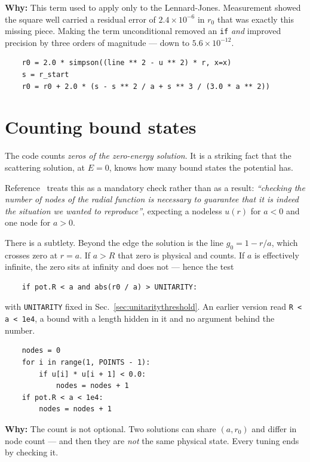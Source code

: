 \documentclass[11pt,a4paper]{article}
\newcommand{\why}[1]{\medskip\noindent\textbf{Why:} #1\medskip}
\begin{document}
\why{This term used to apply only to the Lennard-Jones. Measurement showed the
square well carried a residual error of $2.4\times10^{-6}$ in $r_0$ that was
exactly this missing piece. Making the term unconditional removed an
\texttt{if} \emph{and} improved precision by three orders of magnitude --- down
to $5.6\times10^{-12}$.}

\begin{lstlisting}
    r0 = 2.0 * simpson((line ** 2 - u ** 2) * r, x=x)
    s = r_start
    r0 = r0 + 2.0 * (s - s ** 2 / a + s ** 3 / (3.0 * a ** 2))
\end{lstlisting}

\section{Counting bound states}
\label{sec:nodes}

The code counts \emph{zeros of the zero-energy solution}. It is a striking fact
that the scattering solution, at $E=0$, knows how many bound states the
potential has.

Reference~\cite{rbef} treats this as a mandatory check rather than as a result:
\emph{``checking the number of nodes of the radial function is necessary to
guarantee that it is indeed the situation we wanted to reproduce''}, expecting a
nodeless $u(r)$ for $a<0$ and one node for $a>0$.

There is a subtlety. Beyond the edge the solution is the line $g_0 = 1 - r/a$,
which crosses zero at $r = a$. If $a > R$ that zero is physical and counts. If
$a$ is effectively infinite, the zero sits at infinity and does not --- hence
the test
\begin{lstlisting}
    if pot.R < a and abs(r0 / a) > UNITARITY:
\end{lstlisting}
with \texttt{UNITARITY} fixed in Sec.~\ref{sec:unitaritythreshold}. An earlier
version read \texttt{R < a < 1e4}, a bound with a length hidden in it and no
argument behind the number.

\begin{lstlisting}
    nodes = 0
    for i in range(1, POINTS - 1):
        if u[i] * u[i + 1] < 0.0:
            nodes = nodes + 1
    if pot.R < a < 1e4:
        nodes = nodes + 1
\end{lstlisting}

\why{The count is not optional. Two solutions can share $(a, r_0)$ and differ in
node count --- and then they are \emph{not} the same physical state. Every
tuning ends by checking it.}
\end{document}
